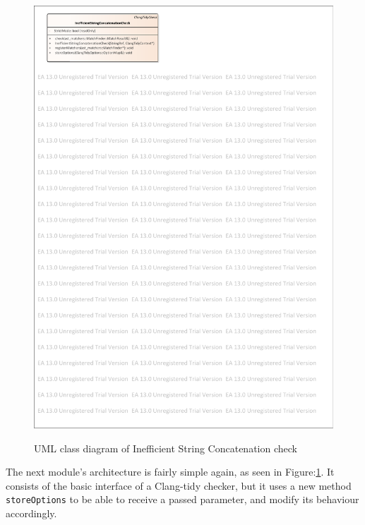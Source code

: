 \begin{figure}[H]
	\caption{UML class diagram of Inefficient String Concatenation check}
	\centering
	\includegraphics[scale=1.8]{images/InefficientStringConcatenation.pdf}
	\label{string_concat_check}
\end{figure}
\par The next module's architecture is fairly simple again, as seen in Figure:\ref{string_concat_check}. It consists of the basic interface of a Clang-tidy checker, but it uses a new method \verb|storeOptions| to be able to receive a passed parameter, and modify its behaviour accordingly. 
